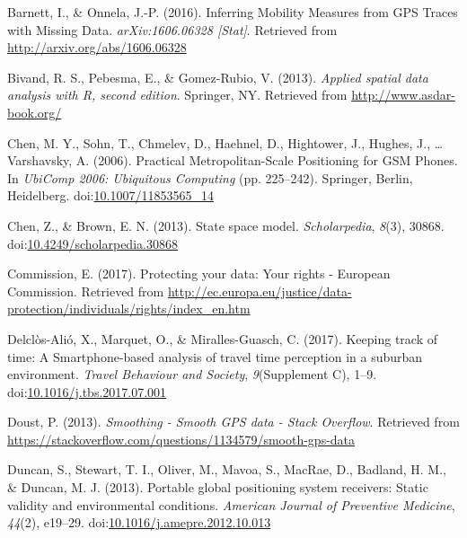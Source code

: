\documentclass[english,man]{apa6}
\theoremstyle{definition}
\theoremstyle{definition}
\theoremstyle{definition}
\theoremstyle{remark}
\begin{document}
\setlength{\parindent}{-0.5in} \setlength{\leftskip}{0.5in}

\hypertarget{refs}{}
\hypertarget{ref-barnett_inferring_2016}{}
Barnett, I., \& Onnela, J.-P. (2016). Inferring Mobility Measures from
GPS Traces with Missing Data. \emph{arXiv:1606.06328 {[}Stat{]}}.
Retrieved from \url{http://arxiv.org/abs/1606.06328}

\hypertarget{ref-sp2}{}
Bivand, R. S., Pebesma, E., \& Gomez-Rubio, V. (2013). \emph{Applied
spatial data analysis with R, second edition}. Springer, NY. Retrieved
from \url{http://www.asdar-book.org/}

\hypertarget{ref-chen_practical_2006}{}
Chen, M. Y., Sohn, T., Chmelev, D., Haehnel, D., Hightower, J., Hughes,
J., \ldots{} Varshavsky, A. (2006). Practical Metropolitan-Scale
Positioning for GSM Phones. In \emph{UbiComp 2006: Ubiquitous Computing}
(pp. 225--242). Springer, Berlin, Heidelberg.
doi:\href{https://doi.org/10.1007/11853565_14}{10.1007/11853565\_14}

\hypertarget{ref-chen_state_2013}{}
Chen, Z., \& Brown, E. N. (2013). State space model.
\emph{Scholarpedia}, \emph{8}(3), 30868.
doi:\href{https://doi.org/10.4249/scholarpedia.30868}{10.4249/scholarpedia.30868}

\hypertarget{ref-commission_protecting_2017}{}
Commission, E. (2017). Protecting your data: Your rights - European
Commission. Retrieved from
\url{http://ec.europa.eu/justice/data-protection/individuals/rights/index_en.htm}

\hypertarget{ref-delclos-alio_keeping_2017}{}
Delclòs-Alió, X., Marquet, O., \& Miralles-Guasch, C. (2017). Keeping
track of time: A Smartphone-based analysis of travel time perception in
a suburban environment. \emph{Travel Behaviour and Society},
\emph{9}(Supplement C), 1--9.
doi:\href{https://doi.org/10.1016/j.tbs.2017.07.001}{10.1016/j.tbs.2017.07.001}

\hypertarget{ref-doust_smoothing_2013}{}
Doust, P. (2013). \emph{Smoothing - Smooth GPS data - Stack Overflow}.
Retrieved from
\url{https://stackoverflow.com/questions/1134579/smooth-gps-data}

\hypertarget{ref-duncan_portable_2013}{}
Duncan, S., Stewart, T. I., Oliver, M., Mavoa, S., MacRae, D., Badland,
H. M., \& Duncan, M. J. (2013). Portable global positioning system
receivers: Static validity and environmental conditions. \emph{American
Journal of Preventive Medicine}, \emph{44}(2), e19--29.
doi:\href{https://doi.org/10.1016/j.amepre.2012.10.013}{10.1016/j.amepre.2012.10.013}
\end{document}
